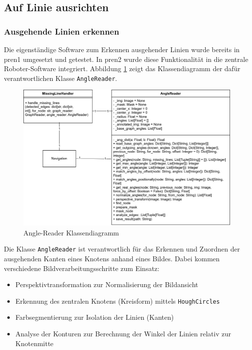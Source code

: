 \subsection{Auf Linie ausrichten}



\subsubsection{Ausgehende Linien erkennen}
\label{outgoing-lines}

Die eigenständige Software zum Erkennen ausgehender Linien wurde bereits in \acrshort{pren1} umgesetzt und getestet. In \acrshort{pren2} wurde diese Funktionalität in die zentrale Roboter-Software integriert. Abbildung \ref{fig:angle-reader-classdiagramm} zeigt das Klassendiagramm der dafür verantwortlichen Klasse \verb|AngleReader|.

\begin{figure}[H]
    \centering
    \includegraphics[width=1\linewidth]{assets/IT/robot-sw-architecture-node_reader_angles.png}
    \caption{Angle-Reader Klassendiagramm}
    \label{fig:angle-reader-classdiagramm}
\end{figure}

Die Klasse \verb|AngleReader| ist verantwortlich für das Erkennen und Zuordnen der ausgehenden Kanten eines Knotens anhand eines Bildes. Dabei kommen verschiedene Bildverarbeitungsschritte zum Einsatz: 
\begin{itemize}
    \item Perspektivtransformation zur Normalisierung der Bildansicht
    \item Erkennung des zentralen Knotens (Kreisform) mittels \verb|HoughCircles|
    \item Farbsegmentierung zur Isolation der Linien (Kanten)
    \item Analyse der Konturen zur Berechnung der Winkel der Linien relativ zur Knotenmitte
\end{itemize}

